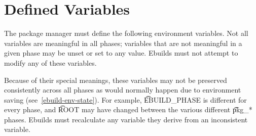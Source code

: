 \section{Defined Variables}
\label{ebuild-env-vars}

The package manager must define the following environment variables. Not all variables are
meaningful in all phases; variables that are not meaningful in a given phase may be unset or set to
any value. Ebuilds must not attempt to modify any of these variables.

Because of their special meanings, these variables may not be preserved consistently across all
phases as would normally happen due to environment saving (see~\ref{ebuild-env-state}). For example,
\t{EBUILD\_PHASE} is different for every phase, and \t{ROOT} may have changed between the various
different \t{pkg\_*} phases. Ebuilds must recalculate any variable they derive from an inconsistent
variable.

